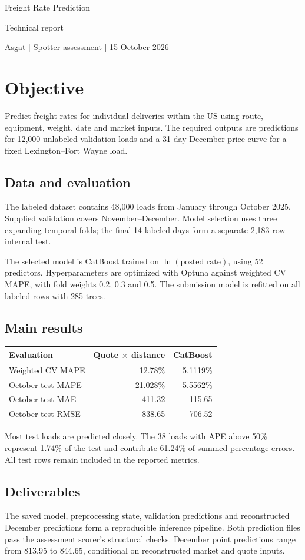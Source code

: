 \documentclass[10pt,a4paper]{article}
\begin{document}
{\Huge\sffamily\color{navy}Freight Rate Prediction}\par
{\Large\sffamily Technical report}\par
{\color{muted}Asgat | Spotter assessment | 15 October 2026}
\vspace{12pt}
\section*{Objective}
Predict freight rates for individual deliveries within the US using route, equipment, weight, date and market inputs. The required outputs are predictions for 12,000 unlabeled validation loads and a 31-day December price curve for a fixed Lexington--Fort Wayne load.
\subsection*{Data and evaluation}
The labeled dataset contains 48,000 loads from January through October 2025. Supplied validation covers November--December. Model selection uses three expanding temporal folds; the final 14 labeled days form a separate 2,183-row internal test.

The selected model is CatBoost trained on $\ln(\text{posted rate})$, using 52 predictors. Hyperparameters are optimized with Optuna against weighted CV MAPE, with fold weights 0.2, 0.3 and 0.5. The submission model is refitted on all labeled rows with 285 trees.
\subsection*{Main results}
\begin{center}
\begin{tabularx}{\linewidth}{Yrr}
\toprule Evaluation & Quote $\times$ distance & CatBoost \\
\midrule Weighted CV MAPE & 12.78\% & 5.1119\% \\
October test MAPE & 21.028\% & 5.5562\% \\
October test MAE & 411.32 & 115.65 \\
October test RMSE & 838.65 & 706.52 \\
\bottomrule
\end{tabularx}
\end{center}
Most test loads are predicted closely. The 38 loads with APE above 50\% represent 1.74\% of the test and contribute 61.24\% of summed percentage errors. All test rows remain included in the reported metrics.
\subsection*{Deliverables}
The saved model, preprocessing state, validation predictions and reconstructed December predictions form a reproducible inference pipeline. Both prediction files pass the assessment scorer's structural checks. December point predictions range from 813.95 to 844.65, conditional on reconstructed market and quote inputs.
\end{document}
